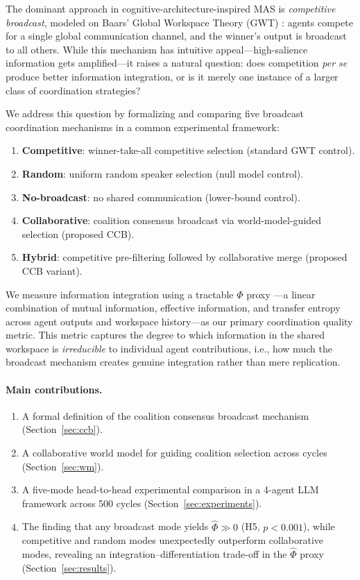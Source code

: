 \documentclass[11pt]{article}
\theoremstyle{definition}
\begin{document}
The dominant approach in cognitive-architecture-inspired MAS is \emph{competitive broadcast},
modeled on Baars' Global Workspace Theory (GWT) \citep{baars1988}: agents compete for a
single global communication channel, and the winner's output is broadcast to all others.
While this mechanism has intuitive appeal---high-salience information gets amplified---it
raises a natural question: does competition \emph{per se} produce better information
integration, or is it merely one instance of a larger class of coordination strategies?

We address this question by formalizing and comparing five broadcast coordination mechanisms
in a common experimental framework:

\begin{enumerate}[noitemsep]
\item \textbf{Competitive}: winner-take-all competitive selection (standard GWT control).
\item \textbf{Random}: uniform random speaker selection (null model control).
\item \textbf{No-broadcast}: no shared communication (lower-bound control).
\item \textbf{Collaborative}: coalition consensus broadcast via world-model-guided selection (proposed CCB).
\item \textbf{Hybrid}: competitive pre-filtering followed by collaborative merge (proposed CCB variant).
\end{enumerate}

We measure information integration using a tractable $\Phi$ proxy \citep{phua2025}---a
linear combination of mutual information, effective information, and transfer entropy
across agent outputs and workspace history---as our primary coordination quality metric.
This metric captures the degree to which information in the shared workspace is
\emph{irreducible} to individual agent contributions, i.e., how much the broadcast
mechanism creates genuine integration rather than mere replication.

\paragraph{Main contributions.}
\begin{enumerate}[noitemsep]
\item A formal definition of the coalition consensus broadcast mechanism (Section~\ref{sec:ccb}).
\item A collaborative world model for guiding coalition selection across cycles (Section~\ref{sec:wm}).
\item A five-mode head-to-head experimental comparison in a 4-agent LLM framework across 500 cycles (Section~\ref{sec:experiments}).
\item The finding that any broadcast mode yields $\hat{\Phi} \gg 0$ (H5, $p < 0.001$), while competitive and random modes unexpectedly outperform collaborative modes, revealing an integration--differentiation trade-off in the $\hat{\Phi}$ proxy (Section~\ref{sec:results}).
\end{enumerate}
\end{document}
